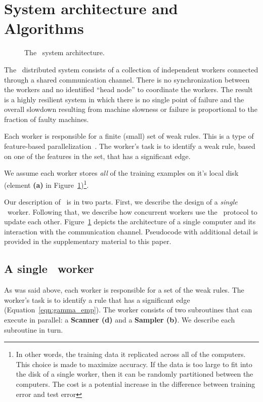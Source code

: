 \section{System architecture and Algorithms} \label{sec:Algorithms}

\begin{figure}
\centering
    \caption{The \Sparrow\ system architecture.}\label{fig:architecture}
    \vspace{0pt}
\end{figure}

The \Sparrow\ distributed system consists of a collection of independent workers
connected through a shared communication channel. There is no
synchronization between the workers and no identified ``head node'' to
coordinate the workers. The result is a highly resilient system in which
there is no single point of failure and the overall slowdown resulting
from machine slowness or failure is proportional to the fraction of
faulty machines.

Each worker is responsible for a finite (small) set of weak
rules. This is a type of feature-based
parallelization~\cite{caragea_framework_2004}. The worker's task is to
identify a weak rule, based on one of the features in the set, that has
a significant edge.

We assume each worker stores {\em all} of the training examples
on it's local disk (element {\bf (a)} in Figure~\ref{fig:architecture})\footnote{In other
  words, the training data it replicated across all of the
  computers. This choice is made to maximize accuracy. If the data is
  too large to fit into the disk of a single worker, then it can be
  randomly partitioned between the computers. The cost is a potential increase
  in the difference between training error and test error}.

Our description of \Sparrow\ is in two parts. First, we describe the
design of a {\em single} \Sparrow\ worker. Following that, we describe
how concurrent workers use the \tmsn\ protocol to update each
other. Figure~\ref{fig:architecture} depicts the architecture of a
single computer and its interaction with the communication
channel. Pseudocode with additional detail is provided in the
supplementary material to this paper.

\subsection{A single \Sparrow\ worker}
\label{sec:single_worker}
As was said above, each worker is responsible for a set of the weak
rules.  The worker's task is to identify a rule that has a significant
edge (Equation~\ref{eqn:gamma_emp}). The worker consists of two
subroutines that can execute in parallel: a {\bf Scanner (d)} and a
{\bf Sampler (b)}. We describe each subroutine in turn.
